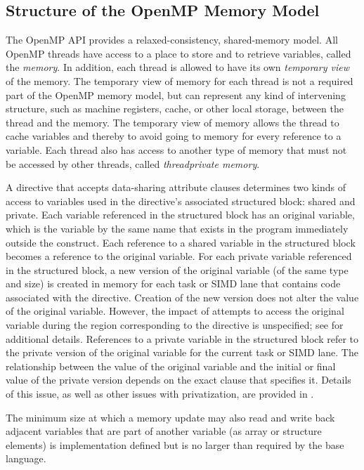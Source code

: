 \subsection{Structure of the OpenMP Memory Model}
\label{subsec:Structure of the OpenMP Memory Model}
The OpenMP API provides a relaxed-consistency, shared-memory model. All OpenMP
threads have access to a place to store and to retrieve variables,
called the \emph{memory}. In
addition, each thread is allowed to have its own \emph{temporary view} of the memory. The
temporary view of memory for each thread is not a required part of the OpenMP
memory model, but can represent any kind of intervening structure, such as machine
registers, cache, or other local storage, between the thread and the memory. The
temporary view of memory allows the thread to cache variables and thereby to avoid
going to memory for every reference to a variable. Each thread also has access to
another type of memory that must not be accessed by other threads,
called \emph{threadprivate memory}.

A directive that accepts data-sharing attribute clauses determines two kinds of access to
variables used in the directive's associated structured block: shared and private. Each
variable referenced in the structured block has an original variable, which is the variable
by the same name that exists in the program immediately outside the construct. Each
reference to a shared variable in the structured block becomes a reference to the original
variable. For each private variable referenced in the structured block, a new version of
the original variable (of the same type and size) is created in memory for each task or
SIMD lane that contains code associated with the directive. Creation of the new version
does not alter the value of the original variable. However, the impact of attempts to
access the original variable during the region corresponding to the directive is
unspecified; see  for additional details. References to a
private variable in the structured block refer to the private version of the original
variable for the current task or SIMD lane. The relationship between the value of the
original variable and the initial or final value of the private version depends on the exact
clause that specifies it. Details of this issue, as well as other issues with privatization,
are provided in .

The minimum size at which a memory update may also read and write back adjacent
variables that are part of another variable (as array or structure elements) is
implementation defined but is no larger than required by the base language.

